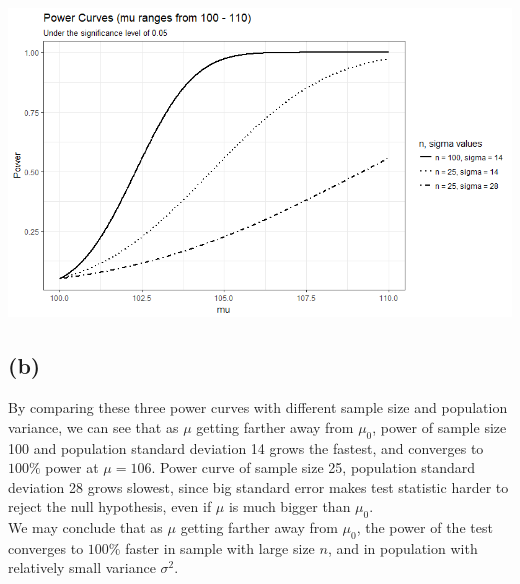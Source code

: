 \documentclass[12pt,letterpaper]{article}
\begin{document}
\includegraphics[width=170mm]{powercurve.png}

\subsection*{(b)}
By comparing these three power curves with different sample size and population variance, we can see that as $\mu$ getting farther away from $\mu_0$, power of sample size 100 and population standard deviation 14 grows the fastest, and converges to $100\%$ power at $\mu = 106$. Power curve of sample size 25, population standard deviation 28 grows slowest, since big standard error makes test statistic harder to reject the null hypothesis, even if $\mu$ is much bigger than $\mu_0$. \\

\noindent  We may conclude that as $\mu$ getting farther away from $\mu_0$, the power of the test converges to $100\%$ faster in sample with large size $n$, and in population with relatively small variance $\sigma^2$. 
\end{document}
